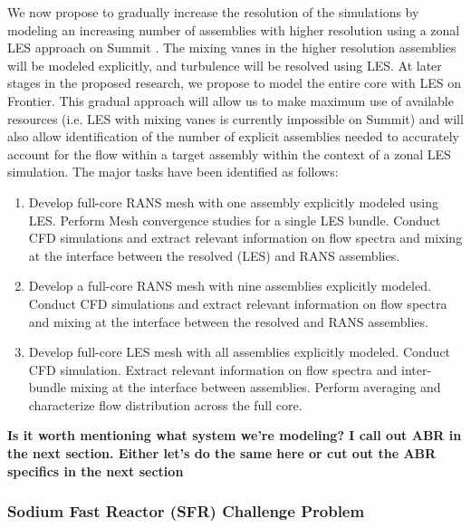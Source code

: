 We now propose to gradually increase the resolution of the simulations by modeling an increasing number of assemblies with higher resolution using a zonal LES approach on Summit \cite{menter2012global}. The mixing vanes in the higher resolution assemblies will be modeled explicitly, and turbulence will be resolved using LES. At later stages in the proposed research, we propose to model the entire core with LES on Frontier. This gradual approach will allow us to make maximum use of available resources (i.e. LES with mixing vanes is currently impossible on Summit) and will also allow identification of the number of explicit assemblies needed to accurately account for the flow within a target assembly within the context of a zonal LES simulation. The major tasks have been identified as follows:

\vspace{-.15in}
\begin{enumerate}[label=\textbf{\Roman*}]
\item Develop full-core RANS mesh with one assembly explicitly modeled using
LES.  Perform Mesh convergence studies for a single LES bundle. Conduct CFD
simulations and extract relevant information on flow spectra and mixing at the
interface between the resolved (LES) and RANS assemblies.
\item Develop a full-core RANS mesh with nine assemblies explicitly modeled. Conduct CFD simulations and extract relevant information on flow spectra and mixing at the interface 
between the resolved and RANS assemblies.
\item Develop full-core LES mesh with all assemblies explicitly modeled.
Conduct CFD simulation. Extract relevant information on flow spectra and 
inter-bundle mixing at the interface between assemblies. Perform averaging and
characterize flow distribution across the full core.
\end{enumerate}
\vspace{-.15in}

{\bf Is it worth mentioning what system we're modeling? I call out ABR in the next section. Either let's do the same here or cut out the ABR specifics in the next section}

\vspace{-.25in}
\subsubsection{Sodium Fast Reactor (SFR) Challenge Problem}
\vspace{-.2in}

